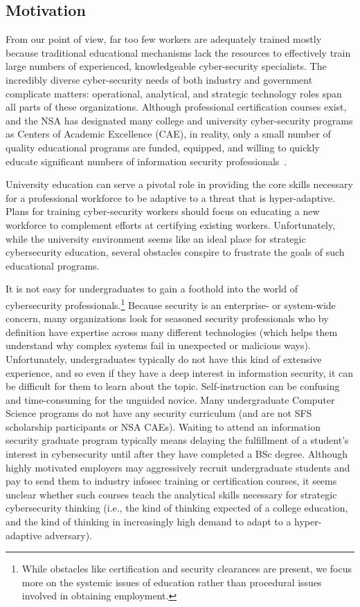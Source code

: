 \subsection{Motivation}

From our point of view, far too few workers are adequately trained
mostly because traditional educational mechanisms lack the resources
to effectively train large numbers of experienced, knowledgeable
cyber-security specialists.  The incredibly diverse cyber-security
needs of both industry and government complicate matters: operational,
analytical, and strategic technology roles span all parts of these
organizations.  Although professional certification courses exist, and
the NSA has designated many college and university cyber-security
programs as Centers of Academic Excellence (CAE), in reality, only a
small number of quality educational programs are funded, equipped, and
willing to quickly educate significant numbers of information security
professionals~\cite{spaf}.

University education can serve a pivotal role in providing the core
skills necessary for a professional workforce to be adaptive to a
threat that is hyper-adaptive.  Plans for training cyber-security
workers should focus on educating a new workforce to complement
efforts at certifying existing workers.  Unfortunately, while the
university environment seems like an ideal place for strategic
cybersecurity education, several obstacles conspire to frustrate the
goals of such educational programs.

It is not easy for undergraduates to gain a foothold into the world of
cybersecurity professionals.\footnote{While obstacles like
  certification and security clearances are present, we focus more on
  the systemic issues of education rather than procedural issues
  involved in obtaining employment.}  Because security is an
enterprise- or system-wide concern, many organizations look for
seasoned security professionals who by definition have expertise
across many different technologies (which helps them understand why
complex systems fail in unexpected or malicious ways).  Unfortunately,
undergraduates typically do not have this kind of extensive
experience, and so even if they have a deep interest in information
security, it can be difficult for them to learn about the topic.
Self-instruction can be confusing and time-consuming for the unguided
novice.  Many undergraduate Computer Science programs do not have any
security curriculum (and are not SFS scholarship participants or NSA
CAEs).  Waiting to attend an information security graduate program
typically means delaying the fulfillment of a student's interest in
cybersecurity until after they have completed a BSc degree.  Although
highly motivated employers may aggressively recruit undergraduate
students and pay to send them to industry infosec training or
certification courses, it seems unclear whether such courses teach the
analytical skills necessary for strategic cybersecurity thinking
(i.e., the kind of thinking expected of a college education, and the
kind of thinking in increasingly high demand to adapt to a
hyper-adaptive adversary).


